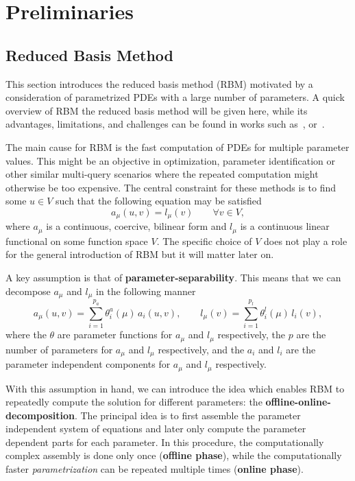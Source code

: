 \section{Preliminaries}


\subsection{Reduced Basis Method}

This section introduces the reduced basis method (RBM) motivated by a consideration of parametrized PDEs with a large number of parameters.
A quick overview of RBM the reduced basis method will be given here, while its advantages, limitations, and challenges can be found in works such as~\cite{Ohlberger2015}, \cite{Quarteroni2015} or~\cite{Hesthaven2016}.

The main cause for RBM is the fast computation of PDEs for multiple parameter values.
This might be an objective in optimization, parameter identification or other similar multi-query scenarios where the repeated computation might otherwise be too expensive.
The central constraint for these methods is to find some $u \in V$ such that the following equation may be satisfied
\begin{equation}\label{StateEq}
    a_\mu(u, v) = l_\mu(v) \qquad \forall v \in V,
\end{equation}
where $a_\mu$ is a continuous, coercive, bilinear form and $l_\mu$ is a continuous linear functional on some function space $V$.
The specific choice of $V$ does not play a role for the general introduction of RBM but it will matter later on.

A key assumption is that of \textbf{parameter-separability}.
This means that we can decompose $a_\mu$ and $l_\mu$ in the following manner
\begin{equation}\label{ParamSep}
    a_\mu(u, v) = \sum\limits_{i = 1}^{p_a} \theta_i^a(\mu) \, a_i(u, v), \qquad l_\mu(v) = \sum\limits_{i = 1}^{p_l} \theta_i^l(\mu) \, l_i(v),
\end{equation}
where the $\theta$ are parameter functions for $a_\mu$ and $l_\mu$ respectively, the $p$ are the number of parameters for $a_\mu$ and $l_\mu$ respectively, and the $a_i$ and $l_i$ are the parameter independent components for $a_\mu$ and $l_\mu$ respectively.

With this assumption in hand, we can introduce the idea which enables RBM to repeatedly compute the solution for different parameters: the \textbf{offline-online-decomposition}.
The principal idea is to first assemble the parameter independent system of equations and later only compute the parameter dependent parts for each parameter.
In this procedure, the computationally complex assembly is done only once (\textbf{offline phase}), while the computationally faster \textit{parametrization} can be repeated multiple times (\textbf{online phase}).

